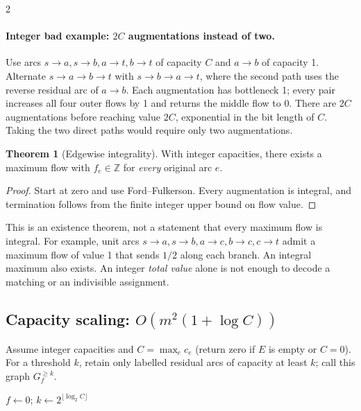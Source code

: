 \documentclass[10pt]{article}
\theoremstyle{definition}
\newtheorem{theorem}[definition]{Theorem}
\begin{document}
\begin{multicols*}{2}
\paragraph{Integer bad example: $2C$ augmentations instead of two.}
Use arcs $s\to a,s\to b,a\to t,b\to t$ of capacity $C$ and
$a\to b$ of capacity 1. Alternate $s\to a\to b\to t$ with
$s\to b\to a\to t$, where the second path uses the reverse residual arc
of $a\to b$. Each augmentation has bottleneck 1; every pair increases all
four outer flows by 1 and returns the middle flow to 0. There are $2C$
augmentations before reaching value $2C$, exponential in the bit length of
$C$. Taking the two direct paths would require only two augmentations.

\begin{theorem}[Edgewise integrality]\label{nf:integrality}
With integer capacities, there exists a maximum flow with $f_e\in\mathbb Z$
for \emph{every} original arc $e$.
\end{theorem}
\begin{proof}
Start at zero and use Ford--Fulkerson. Every augmentation is integral, and
termination follows from the finite integer upper bound on flow value.
\end{proof}
This is an existence theorem, not a statement that every maximum flow is
integral. For example, unit arcs $s\to a,s\to b,a\to c,b\to c,c\to t$
admit a maximum flow of value 1 that sends $1/2$ along each branch.
An integral maximum also exists. An integer \emph{total value} alone is not
enough to decode a matching or an indivisible assignment.

\subsection{Capacity scaling: \texorpdfstring{$O(m^2(1+\log C))$}{O(m squared log C)}}\label{nf:scaling}
Assume integer capacities and $C=\max_e c_e$ (return zero if $E$ is empty or
$C=0$). For a threshold $k$, retain only labelled residual arcs of capacity
at least $k$; call this graph $G_f^{\ge k}$.


\begin{algorithm}[H]
\caption{Capacity scaling: augment only through residual capacities $\ge k$}
$f\gets0$; $k\gets2^{\lfloor\log_2 C\rfloor}$\;
\;
\end{algorithm}

\end{multicols*}
\end{document}
